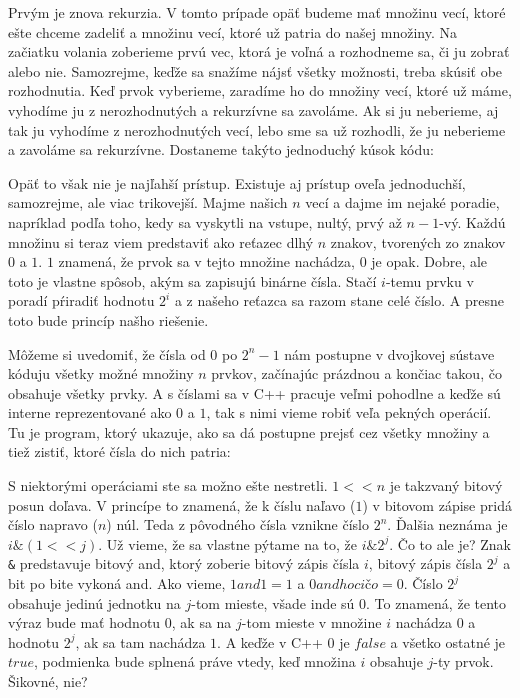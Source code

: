 Prvým je znova rekurzia. V tomto prípade opäť budeme mať množinu vecí, ktoré ešte chceme zadeliť a
množinu vecí, ktoré už patria do našej množiny. Na začiatku volania zoberieme prvú vec, ktorá je
voľná a rozhodneme sa, či ju zobrať alebo nie. Samozrejme, keďže sa snažíme nájsť všetky možnosti,
treba skúsiť obe rozhodnutia. Keď prvok vyberieme, zaradíme ho do množiny vecí, ktoré už máme, vyhodíme
ju z nerozhodnutých a rekurzívne sa zavoláme. Ak si ju neberieme, aj tak ju vyhodíme z
nerozhodnutých vecí, lebo sme sa už rozhodli, že ju neberieme a zavoláme sa rekurzívne. Dostaneme
takýto jednoduchý kúsok kódu:


Opäť to však nie je najľahší prístup. Existuje aj prístup oveľa jednoduchší, samozrejme, ale viac
trikovejší. Majme našich $n$ vecí a dajme im nejaké poradie, napríklad podľa toho, kedy sa
vyskytli na vstupe, nultý, prvý až $n-1$-vý. Každú množinu si teraz viem predstaviť ako reťazec dlhý
$n$ znakov, tvorených zo znakov $0$ a $1$. $1$ znamená, že prvok sa v tejto množine nachádza, $0$ je
opak. Dobre, ale toto je vlastne spôsob, akým sa zapisujú binárne čísla. Stačí $i$-temu prvku v
poradí pŕiradiť hodnotu $2^i$ a z našeho reťazca sa razom stane celé číslo. A presne toto bude
princíp našho riešenie.

Môžeme si uvedomiť, že čísla od $0$ po $2^n-1$ nám postupne v dvojkovej sústave kóduju všetky možné
množiny $n$ prvkov, začínajúc prázdnou a končiac takou, čo obsahuje všetky prvky. A s číslami sa v
C++ pracuje veľmi pohodlne a keďže sú interne reprezentované ako $0$ a $1$, tak s nimi vieme robiť
veľa pekných operácií. Tu je program, ktorý ukazuje, ako sa dá postupne prejsť cez všetky množiny a
tiež zistiť, ktoré čísla do nich patria:


S niektorými operáciami ste sa možno ešte nestretli. \texttt{$1<<n$} je takzvaný bitový posun doľava. V
princípe to znamená, že k číslu naľavo ($1$) v bitovom zápise pridá číslo napravo ($n$) núl. Teda z
pôvodného čísla vznikne číslo $2^n$. Ďalšia neznáma je \texttt{$i\&(1<<j)$}. Už vieme, že sa vlastne pýtame na
to, že $i\&2^j$. Čo to ale je? Znak \verb'&' predstavuje bitový and, ktorý zoberie bitový zápis čísla
$i$, bitový zápis čísla $2^j$ a bit po bite vykoná and. Ako vieme, $1 and 1 = 1$ a $0 and hocičo =
0$. Číslo $2^j$ obsahuje jedinú jednotku na $j$-tom mieste, všade inde sú $0$. To znamená, že tento
výraz bude mať hodnotu $0$, ak sa na $j$-tom mieste v množine $i$ nachádza $0$ a hodnotu $2^j$, ak
sa tam nachádza $1$. A keďže v C++ $0$ je $false$ a všetko ostatné je $true$, podmienka bude
splnená práve vtedy, keď množina $i$ obsahuje $j$-ty prvok. Šikovné, nie?


